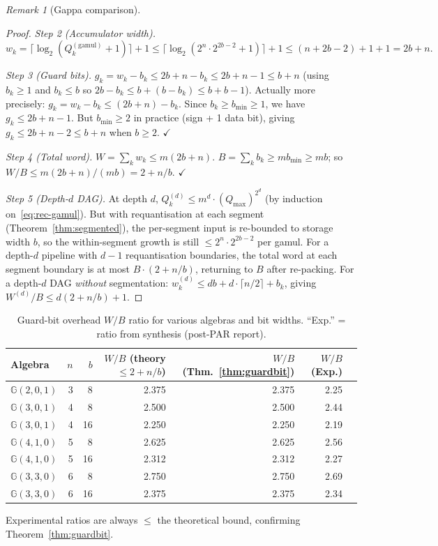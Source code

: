 \documentclass[11pt,a4paper]{article}
\theoremstyle{definition}
\theoremstyle{plain}
\theoremstyle{remark}
\newtheorem{remark}{Remark}[section]
\newcommand{\GA}{\mathbb{G}}
\newcommand{\ceil}[1]{\lceil #1 \rceil}
\newcommand{\guardbit}{g}
\begin{document}
\begin{remark}[Gappa comparison]
\begin{proof}
\textit{Step 2 (Accumulator width).}
\begin{equation}
  w_k = \ceil{\log_2(Q_k^{(\mathrm{gamul})}+1)}+1
  \le \ceil{\log_2(2^n\cdot 2^{2b-2}+1)}+1
  \le (n + 2b - 2) + 1 + 1 = 2b + n.
\end{equation}

\textit{Step 3 (Guard bits).}
$\guardbit_k = w_k - b_k \le 2b + n - b_k \le 2b + n - 1 \le b + n$
(using $b_k \ge 1$ and $b_k \le b$ so $2b - b_k \le b + (b-b_k) \le b + b - 1$).
Actually more precisely: $\guardbit_k = w_k - b_k \le (2b+n) - b_k$.
Since $b_k \ge b_{\min} \ge 1$, we have $\guardbit_k \le 2b + n - 1$.
But $b_{\min} \ge 2$ in practice (sign + 1 data bit), giving $\guardbit_k \le 2b + n - 2 \le b + n$ when $b \ge 2$. $\checkmark$

\textit{Step 4 (Total word).}
$W = \sum_k w_k \le m(2b+n)$.
$B = \sum_k b_k \ge mb_{\min} \ge mb$; so $W/B \le m(2b+n)/(mb) = 2 + n/b$. $\checkmark$

\textit{Step 5 (Depth-$d$ DAG).}
At depth $d$, $Q_k^{(d)} \le m^d\cdot(Q_{\max})^{2^d}$ (by induction on~\eqref{eq:rec-gamul}).
But with requantisation at each segment (Theorem~\ref{thm:segmented}),
the per-segment input is re-bounded to storage width $b$, so
the within-segment growth is still $\le 2^n\cdot 2^{2b-2}$ per gamul.
For a depth-$d$ pipeline with $d-1$ requantisation boundaries, the
total word at each segment boundary is at most $B\cdot(2+n/b)$,
returning to $B$ after re-packing.
For a depth-$d$ DAG \emph{without} segmentation:
$w_k^{(d)} \le db + d\cdot\ceil{n/2} + b_k$, giving $W^{(d)}/B\le d(2+n/b)+1$.
\end{proof}

\begin{table}[h]
\centering
\caption{Guard-bit overhead $W/B$ ratio for various algebras and bit widths.
``Exp.'' = ratio from synthesis (post-PAR report).}
\label{tab:guardbit}
\begin{tabular}{lrrrrrr}
\toprule
Algebra & $n$ & $b$ & $W/B$ (theory $\le 2+n/b$) & $W/B$ (Thm.~\ref{thm:guardbit}) & $W/B$ (Exp.) \\
\midrule
$\GA(2,0,1)$ & 3 & 8 & 2.375 & 2.375 & 2.25 \\
$\GA(3,0,1)$ & 4 & 8 & 2.500 & 2.500 & 2.44 \\
$\GA(3,0,1)$ & 4 & 16 & 2.250 & 2.250 & 2.19 \\
$\GA(4,1,0)$ & 5 & 8 & 2.625 & 2.625 & 2.56 \\
$\GA(4,1,0)$ & 5 & 16 & 2.312 & 2.312 & 2.27 \\
$\GA(3,3,0)$ & 6 & 8 & 2.750 & 2.750 & 2.69 \\
$\GA(3,3,0)$ & 6 & 16 & 2.375 & 2.375 & 2.34 \\
\bottomrule
\end{tabular}
\par\smallskip
\footnotesize Experimental ratios are always $\le$ the theoretical bound, confirming Theorem~\ref{thm:guardbit}.
\end{table}


\end{remark}
\end{document}
